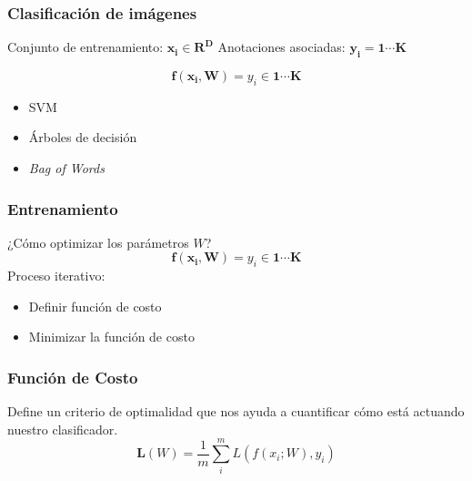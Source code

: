 \documentclass{beamer}
\begin{document}
\begin{frame}
\frametitle{Clasificación de imágenes}

Conjunto de entrenamiento: \(\boldsymbol{x_i} \in \boldsymbol{R^{D}}\)
Anotaciones asociadas: \(\boldsymbol{y_i = 1\cdots K}\)\vfill

\vfill

\begin{equation}
    \boldsymbol{f(x_i, W)} = y_i \in \boldsymbol{1 \cdots K}
\end{equation}\pause

\vfill

\begin{itemize}
    \item SVM 
    \item Árboles de decisión 
    \item \textit{Bag of Words}
\end{itemize}

\end{frame}




\begin{frame}
\frametitle{Entrenamiento}
¿Cómo optimizar los parámetros \(W\)?
\vfill
\begin{equation}
    \boldsymbol{f(x_i, W)} = y_i \in \boldsymbol{1 \cdots K}
\end{equation}\pause
\vfill
Proceso iterativo:
\begin{itemize}
    \item Definir función de costo
    \item Minimizar la función de costo
\end{itemize}
\vfill
\end{frame}




\begin{frame}
\frametitle{Función de Costo}
Define un criterio de optimalidad que nos ayuda a
cuantificar cómo está actuando nuestro clasificador.
\vfill
\begin{equation}
\boldsymbol{L}(W) = \frac{1}{m} \sum^{m}_{i} L(f(x_i;W), y_i)
\end{equation}
\vfill
\end{frame}
\end{document}
